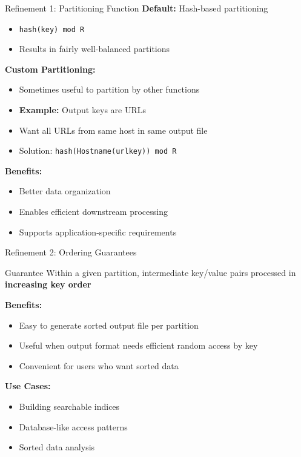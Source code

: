 \documentclass[aspectratio=169]{beamer}
\begin{document}
\begin{frame}{Refinement 1: Partitioning Function}
\textbf{Default:} Hash-based partitioning
\begin{itemize}
    \item \texttt{hash(key) mod R}
    \item Results in fairly well-balanced partitions
\end{itemize}

\vspace{0.3cm}

\textbf{Custom Partitioning:}
\begin{itemize}
    \item Sometimes useful to partition by other functions
    \item \textbf{Example:} Output keys are URLs
    \item Want all URLs from same host in same output file
    \item Solution: \texttt{hash(Hostname(urlkey)) mod R}
\end{itemize}

\vspace{0.3cm}

\textbf{Benefits:}
\begin{itemize}
    \item Better data organization
    \item Enables efficient downstream processing
    \item Supports application-specific requirements
\end{itemize}
\end{frame}

\begin{frame}{Refinement 2: Ordering Guarantees}
\begin{block}{Guarantee}
Within a given partition, intermediate key/value pairs processed in \textbf{increasing key order}
\end{block}

\vspace{0.3cm}

\textbf{Benefits:}
\begin{itemize}
    \item Easy to generate sorted output file per partition
    \item Useful when output format needs efficient random access by key
    \item Convenient for users who want sorted data
\end{itemize}

\vspace{0.3cm}

\textbf{Use Cases:}
\begin{itemize}
    \item Building searchable indices
    \item Database-like access patterns
    \item Sorted data analysis
\end{itemize}
\end{frame}
\end{document}
